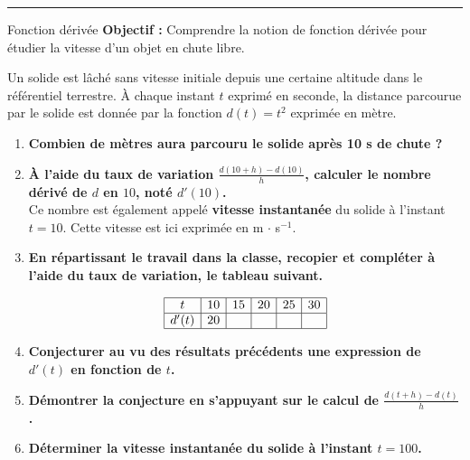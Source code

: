 \documentclass[12pt]{article}
\theoremstyle{break}
\begin{document}
\vfill

\hrule

\vfill

\noindent{
\makebox[0pt][l]{\textbf{\Niveau}}%
\makebox[\textwidth][c]{\textbf{\Chapitre}}%
\makebox[0pt][r]{\textbf{\Document}}
}

\begin{activite*}{Fonction dérivée}{}
    \textbf{Objectif :} Comprendre la notion de fonction dérivée pour étudier la vitesse d'un objet en chute libre.
\end{activite*}

\noindent
Un solide est lâché sans vitesse initiale depuis une certaine altitude dans le référentiel terrestre. À chaque instant $t$ exprimé en seconde, la distance parcourue par le solide est donnée par la fonction $d(t) = t^2$ exprimée en mètre.


\begin{enumerate}
    \item \textbf{Combien de mètres aura parcouru le solide après 10 s de chute ?}

    \item \textbf{À l’aide du taux de variation $\frac{d(10 + h) - d(10)}{h}$, calculer le nombre dérivé de $d$ en $10$, noté $d'(10)$.} \\
    Ce nombre est également appelé \textbf{vitesse instantanée} du solide à l’instant $t = 10$. Cette vitesse est ici exprimée en m $\cdot$ s$^{-1}$.

    \item \textbf{En répartissant le travail dans la classe, recopier et compléter à l'aide du taux de variation, le tableau suivant.}

    \[
    \begin{array}{|c|c|c|c|c|c|}
    \hline
    t & 10 & 15 & 20 & 25 & 30 \\
    \hline
    d'(t) & 20 &   &   &   &   \\
    \hline
    \end{array}
    \]

    \item \textbf{Conjecturer au vu des résultats précédents une expression de $d'(t)$ en fonction de $t$.}

    \item \textbf{Démontrer la conjecture en s’appuyant sur le calcul de $\frac{d(t + h) - d(t)}{h}$.}

    \item \textbf{Déterminer la vitesse instantanée du solide à l’instant $t = 100$.}
\end{enumerate}

\vfill
\end{document}
